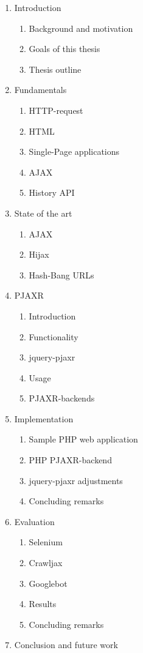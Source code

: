 \documentclass[f,bachelor,binding,twoside,palatino]{WeSTthesis}
\def \ajax {AJAX}
\def \pjaxr {PJAXR}
\def \jqueryPjaxr {jquery-pjaxr}
\def \httpRequest {HTTP-request}
\begin{document}
\begin{enumerate}
  \item Introduction
  \begin{enumerate}[label*=\arabic*.]
    \item Background and motivation
    \item Goals of this thesis
    \item Thesis outline
  \end{enumerate}
  \item Fundamentals
  \begin{enumerate}[label*=\arabic*.]
    \item \httpRequest{}
    \item HTML
    \item Single-Page applications
    \item \ajax{}
    \item History API
  \end{enumerate}
  \item State of the art
  \begin{enumerate}[label*=\arabic*.]
    \item \ajax{}
    \item Hijax
    \item Hash-Bang URLs
  \end{enumerate}
  \item \pjaxr{}
  \begin{enumerate}[label*=\arabic*.]
    \item Introduction
      \item Functionality
    \item \jqueryPjaxr{}
    \item Usage
    \item \pjaxr{}-backends
  \end{enumerate}
  \item Implementation
  \begin{enumerate}[label*=\arabic*.]
    \item Sample PHP web application
    \item PHP \pjaxr{}-backend
    \item \jqueryPjaxr{} adjustments
    \item Concluding remarks
  \end{enumerate}
  \item Evaluation
  \begin{enumerate}[label*=\arabic*.]
    \item Selenium
    \item Crawljax
    \item Googlebot
    \item Results
    \item Concluding remarks
  \end{enumerate}
  \item Conclusion and future work

\end{enumerate}
\end{document}
